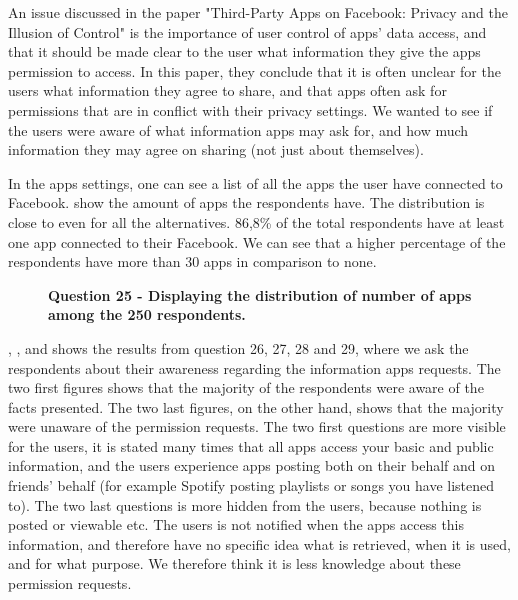 An issue discussed in the paper "Third-Party Apps on Facebook: Privacy and the Illusion of Control" \cite{thirdPartyApps} is the importance of user control of apps' data access, and that it should be made clear to the user what information they give the apps permission to access. In this paper, they conclude that it is often unclear for the users what information they agree to share, and that apps often ask for permissions that are in conflict with their privacy settings. We wanted to see if the users were aware of what information apps may ask for, and how much information they may agree on sharing (not just about themselves). 

In the apps settings, one can see a list of all the apps the user have connected to Facebook.  show the amount of apps the respondents have. The distribution is close to even for all the alternatives. 86,8\% of the total respondents have at least one app connected to their Facebook. We can see that a higher percentage of the respondents have more than 30 apps in comparison to none. 

\begin{figure}[h!]
\centering
{}
\caption[Question 25 - Displaying the distribution of number of apps among the 250 respondents]{\textbf{Question 25 - Displaying the distribution of number of apps among the 250 respondents.}} 
\label{fig:appsyouuse}
\end{figure}

, ,  and  shows the results from question 26, 27, 28 and 29, where we ask the respondents about their awareness regarding the information apps requests. The two first figures shows that the majority of the respondents were aware of the facts presented. The two last figures, on the other hand, shows that the majority were unaware of the permission requests. The two first questions are more visible for the users, it is stated many times that all apps access your basic and public information, and the users experience apps posting both on their behalf and on friends' behalf (for example Spotify posting playlists or songs you have listened to). The two last questions is more hidden from the users, because nothing is posted or viewable etc. The users is not notified when the apps access this information, and therefore have no specific idea what is retrieved, when it is used, and for what purpose. We therefore think it is less knowledge about these permission requests. 

